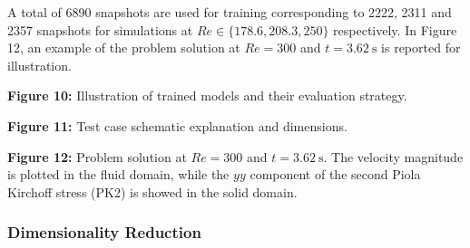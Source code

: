 \documentclass[11pt]{article}
\begin{document}
A total of 6890 snapshots are used for training corresponding to 2222, 2311 and 2357 snapshots for simulations at $Re \in \{178.6, 208.3, 250\}$ respectively. In Figure 12, an example of the problem solution at $Re = 300$ and $t = 3.62\ \mathrm{s}$ is reported for illustration.

\begin{center}
\textbf{Figure 10:} Illustration of trained models and their evaluation strategy.
\end{center}

\begin{center}
\textbf{Figure 11:} Test case schematic explanation and dimensions.
\end{center}

\begin{center}
\textbf{Figure 12:} Problem solution at $Re = 300$ and $t = 3.62\ \mathrm{s}$. The velocity magnitude is plotted in the fluid domain, while the $yy$ component of the second Piola Kirchoff stress (PK2) is showed in the solid domain.
\end{center}

\subsubsection{Dimensionality Reduction}
\end{document}
